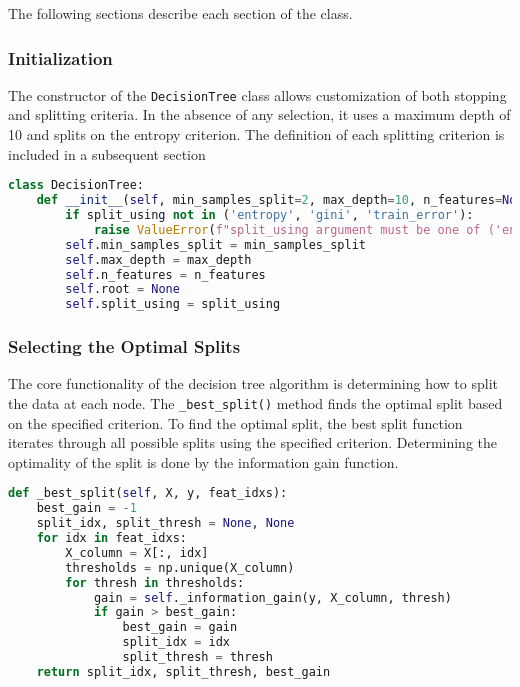 \documentclass{article}
\begin{document}
The following sections describe each section of the class.

\subsubsection{Initialization}
The constructor of the \texttt{DecisionTree} class allows customization of both stopping and splitting criteria. In the absence of any selection, it uses a maximum depth of 10 and splits on the entropy criterion. The definition of each splitting criterion is included in a subsequent section

\begin{lstlisting}[language=Python, caption=DecisionTree Class Initialization]
class DecisionTree:
    def __init__(self, min_samples_split=2, max_depth=10, n_features=None, split_using="entropy"):
        if split_using not in ('entropy', 'gini', 'train_error'):
            raise ValueError(f"split_using argument must be one of ('entropy', 'gini', 'train_error')")
        self.min_samples_split = min_samples_split
        self.max_depth = max_depth
        self.n_features = n_features
        self.root = None
        self.split_using = split_using
\end{lstlisting}

\subsubsection{Selecting the Optimal Splits}
The core functionality of the decision tree algorithm is determining how to split the data at each node. The \texttt{\_best\_split()} method finds the optimal split based on the specified criterion. To find the optimal split, the best split function iterates through all possible splits using the specified criterion. Determining the optimality of the split is done by the information gain function. 

\begin{lstlisting}[language=Python, caption=Selecting the best split]
def _best_split(self, X, y, feat_idxs):
    best_gain = -1
    split_idx, split_thresh = None, None
    for idx in feat_idxs:
        X_column = X[:, idx]
        thresholds = np.unique(X_column)
        for thresh in thresholds:
            gain = self._information_gain(y, X_column, thresh)
            if gain > best_gain:
                best_gain = gain
                split_idx = idx
                split_thresh = thresh
    return split_idx, split_thresh, best_gain
\end{lstlisting}
\end{document}
